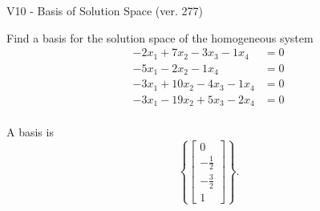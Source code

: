 \begin{exercise}
  \begin{exerciseTitle}V10 - Basis of Solution Space (ver. 277)\end{exerciseTitle}
  \begin{exerciseStatement}
    Find a basis for the solution space of the homogeneous system 
\begin{align*}
 -2 x_ 1 + 7 x_ 2 -3 x_ 3 -1 x_ 4 &= 0  \\ 
  -5 x_ 1 -2 x_ 2 -1 x_ 4 &= 0  \\ 
  -3 x_ 1 + 10 x_ 2 -4 x_ 3 -1 x_ 4 &= 0  \\ 
  -3 x_ 1 -19 x_ 2 + 5 x_ 3 -2 x_ 4 &= 0  \\ 
 \end{align*}


 
  \end{exerciseStatement}

  \begin{exerciseAnswer}
   A basis is   
\[\left\{\left[\begin{array}{c}
0 \\
-\frac{1}{2} \\
-\frac{3}{2} \\
1
\end{array}\right]\right\}.\]

  


  \end{exerciseAnswer}
\end{exercise}